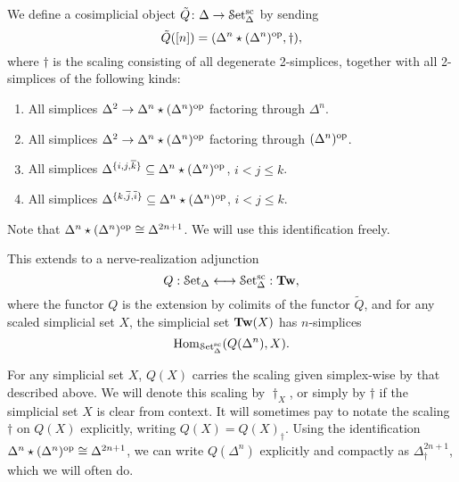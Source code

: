 \documentclass[main.tex]{subfiles}
\begin{document}
\begin{definition}
  We define a cosimplicial object $\tilde{Q}\colon \Delta \to \mathcal{S}\mathrm{et}_{\Delta}^{\mathrm{sc}}$ by sending
  \begin{equation*}
    \tilde{Q}([n]) = (\Delta^{n} \star (\Delta^{n})^{\mathrm{op}}, \dagger),
  \end{equation*}
  where $\dagger$ is the scaling consisting of all degenerate 2-simplices, together with all 2-simplices of the following kinds:
  \begin{enumerate}
    \item All simplices $\Delta^{2} \to \Delta^{n} \star (\Delta^{n})^{\mathrm{op}}$ factoring through $\Delta^{n}$.

    \item All simplices $\Delta^{2} \to \Delta^{n} \star (\Delta^{n})^{\mathrm{op}}$ factoring through $(\Delta^{n})^{\mathrm{op}}$.

    \item All simplices $\Delta^{\{i, j, \overline{k}\}} \subseteq \Delta^{n} \star (\Delta^{n})^{\mathrm{op}}$, $i < j \leq k$.

    \item All simplices $\Delta^{\{k, \overline{j}, \overline{i}\}} \subseteq \Delta^{n} \star (\Delta^{n})^{\mathrm{op}}$, $i < j \leq k$.
  \end{enumerate}
\end{definition}

Note that $\Delta^{n} \star (\Delta^{n})^{\mathrm{op}} \cong \Delta^{2n+1}$. We will use this identification freely.

This extends to a nerve-realization adjunction
\begin{equation*}
  Q : \mathcal{S}\mathrm{et}_{\Delta} \longleftrightarrow \mathcal{S}\mathrm{et}_{\Delta}^{\mathrm{sc}} : \mathbf{Tw},
\end{equation*}
where the functor $Q$ is the extension by colimits of the functor $\tilde{Q}$, and for any scaled simplicial set $X$, the simplicial set $\mathbf{Tw}(X)$ has $n$-simplices
\begin{equation*}
  \mathrm{Hom}_{\mathcal{S}\mathrm{et}_{\Delta}^{\mathrm{sc}}}(Q(\Delta^{n}), X).
\end{equation*}

\begin{notation}
  For any simplicial set $X$, $Q(X)$ carries the scaling given simplex-wise by that described above. We will denote this scaling by $\dagger_{X}$, or simply by $\dagger$ if the simplicial set $X$ is clear from context. It will sometimes pay to notate the scaling $\dagger$ on $Q(X)$ explicitly, writing $Q(X) = Q(X)_{\dagger}$. Using the identification $\Delta^{n} \star (\Delta^{n})^{\mathrm{op}} \cong \Delta^{2n+1}$, we can write $Q(\Delta^{n})$ explicitly and compactly as $\Delta^{2n+1}_{\dagger}$, which we will often do.
\end{notation}
\end{document}
